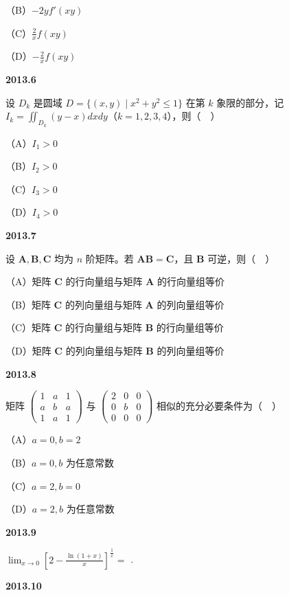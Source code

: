 \documentclass[UTF8,12pt,fontset=windows]{ctexart}
\begin{document}
（B）$-2yf'(xy)$

（C）$\frac{2}{x}f(xy)$

（D）$-\frac{2}{x}f(xy)$

\vfill
\newpage
{\large\bfseries 2013.6}

设 $D_k$ 是圆域 $D = \{(x, y) \mid x^2 + y^2 \le 1\}$ 在第 $k$ 象限的部分，记 $I_k = \iint_{D_k}(y - x)dxdy$（$k = 1, 2, 3, 4$），则（　）

（A）$I_1 > 0$

（B）$I_2 > 0$

（C）$I_3 > 0$

（D）$I_4 > 0$

\vfill
\newpage
{\large\bfseries 2013.7}

设 $\boldsymbol{A}, \boldsymbol{B}, \boldsymbol{C}$ 均为 $n$ 阶矩阵。若 $\boldsymbol{AB} = \boldsymbol{C}$，且 $\boldsymbol{B}$ 可逆，则（　）

（A）矩阵 $\boldsymbol{C}$ 的行向量组与矩阵 $\boldsymbol{A}$ 的行向量组等价

（B）矩阵 $\boldsymbol{C}$ 的列向量组与矩阵 $\boldsymbol{A}$ 的列向量组等价

（C）矩阵 $\boldsymbol{C}$ 的行向量组与矩阵 $\boldsymbol{B}$ 的行向量组等价

（D）矩阵 $\boldsymbol{C}$ 的列向量组与矩阵 $\boldsymbol{B}$ 的列向量组等价

\vfill
\newpage
{\large\bfseries 2013.8}

矩阵 $\begin{pmatrix} 1 & a & 1 \\ a & b & a \\ 1 & a & 1 \end{pmatrix}$ 与 $\begin{pmatrix} 2 & 0 & 0 \\ 0 & b & 0 \\ 0 & 0 & 0 \end{pmatrix}$ 相似的充分必要条件为（　）

（A）$a = 0, b = 2$

（B）$a = 0, b$ 为任意常数

（C）$a = 2, b = 0$

（D）$a = 2, b$ 为任意常数

\vfill
\newpage
{\large\bfseries 2013.9}

$\lim_{x \to 0}\left[2 - \frac{\ln(1 + x)}{x}\right]^{\frac{1}{x}} =$ \underline{\hspace{20mm}}.

\vfill
\newpage
{\large\bfseries 2013.10}
\end{document}
